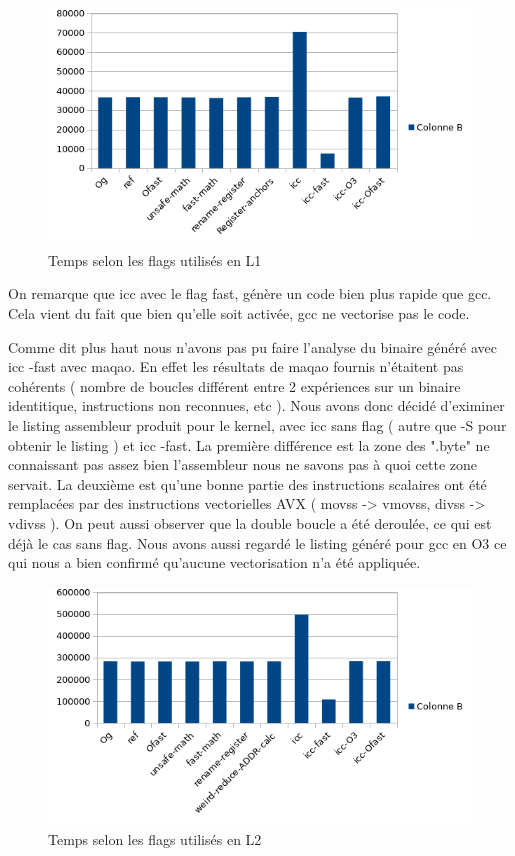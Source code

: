 \documentclass{report}
\begin{document}
\newpage
   \begin{figure}[ht!]
        \centering
        \includegraphics[width=120mm]{MEDIA/time_L1.png}
        \caption{Temps selon les flags utilisés en L1}
    \end{figure}
On remarque que icc avec le flag fast, génère un code bien plus rapide que gcc.
Cela vient du fait que bien qu'elle soit activée, gcc ne vectorise pas le code.

Comme dit plus haut nous n'avons pas pu faire l'analyse du binaire généré avec icc -fast avec maqao. En effet les résultats de maqao fournis n'étaitent pas cohérents 
( nombre de boucles différent entre 2 expériences sur un binaire identitique, instructions non reconnues, etc ). Nous avons donc décidé d'eximiner le listing assembleur produit pour le kernel,
 avec icc sans flag ( autre que -S pour obtenir le listing ) et icc -fast. La première différence est la zone des ".byte" ne connaissant pas assez bien l'assembleur nous ne savons pas à quoi cette zone servait.
La deuxième est qu'une bonne partie des instructions scalaires ont été remplacées par des instructions vectorielles AVX
( movss -> vmovss, divss -> vdivss ). On peut aussi observer que la double boucle a été deroulée, ce qui est déjà le cas sans flag. Nous avons aussi regardé le listing généré pour gcc en O3 ce qui nous a bien confirmé qu'aucune vectorisation n'a été appliquée. 
\newpage
   \begin{figure}[ht!]
        \centering
        \includegraphics[width=120mm]{MEDIA/Resultat_TEST_L2.png}
        \caption{Temps selon les flags utilisés en L2}
    \end{figure}
\end{document}
